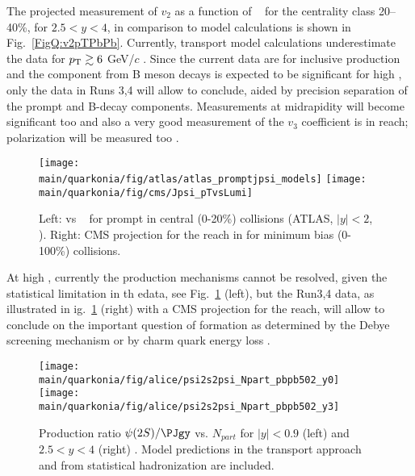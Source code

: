 \documentclass[../report.tex]{subfiles}
\providecommand{\main}{..}
\begin{document}
The projected measurement of \PJgy $v_2$ as a function of \pT~ for the centrality class 20--40\%, for $2.5<y<4$, in comparison to model calculations \cite{Du:2015wha} is shown in Fig.~\ref{FigQ:v2pTPbPb}. Currently, transport model calculations \cite{Zhou:2014kka,Du:2015wha} underestimate the data for $p\sb{\scriptstyle\mathrm{T}}\gtrsim 6$ GeV/$c$ \cite{Acharya:2017tgv}. Since the current data are for inclusive \PJgy production and the component from B meson decays is expected to be significant for high \pT, only the data in Runs 3,4 will allow to conclude, aided by precision separation of the prompt and B-decay components. Measurements at midrapidity will become significant too and also a very good measurement of the $v_3$ coefficient is in reach; polarization will be measured too \cite{Abelevetal:2014cna}.

\begin{figure}[h]
\begin{center}
 \texttt{[image: \\main/quarkonia/fig/atlas/atlas\_promptjpsi\_models]}
 \texttt{[image: \\main/quarkonia/fig/cms/Jpsi\_pTvsLumi]}
\end{center}
\caption{Left: \RAA vs \pT~ for prompt \PJgy in central (0-20\%) collisions (ATLAS, $|y|<2$, \cite{Aaboud:2018quy}). Right: CMS projection for the reach in \pT for minimum bias (0-100\%) collisions.
}
\label{FigQ:JpTPbPb}
\end{figure}

At high \pT, currently the production mechanisms cannot be resolved, given the statistical limitation in th edata, see Fig.~\ref{FigQ:JpTPbPb} (left), but the Run3,4 data, as illustrated in ig.~\ref{FigQ:JpTPbPb} (right) with a CMS projection for the \pT reach, will allow to conclude on the important question of \PJgy
formation as determined by the Debye screening mechanism \cite{Kopeliovich:2014una,Aronson:2017ymv} or by %
charm quark energy loss \cite{Spousta:2016agr,Arleo:2017ntr}.



\begin{figure}[h]
\begin{center}
 \texttt{[image: \\main/quarkonia/fig/alice/psi2s2psi\_Npart\_pbpb502\_y0]}
 \texttt{[image: \\main/quarkonia/fig/alice/psi2s2psi\_Npart\_pbpb502\_y3]}
\end{center}
 \caption{Production ratio $\psi(2S)/\PJgy$ vs. $N_{part}$ for $|y|<0.9$ (left) and $2.5<y<4$ (right) \cite{Abelevetal:2014cna,CERN-LHCC-2013-014}. Model predictions in the transport approach \cite{Du:2015wha}  and from statistical hadronization \cite{Andronic:2017pug} are included.}
\label{FigQ:psi2SPbPb}
\end{figure}
\end{document}

